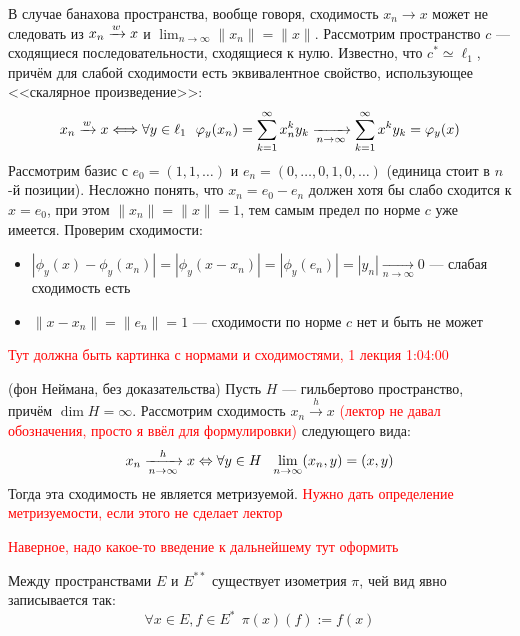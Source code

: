 \begin{anote}
	В случае банахова пространства, вообще говоря, сходимость $x_n \to x$ может не следовать из $x_n \xrightarrow{w} x$ и $\lim_{n \to \infty} \|x_n\| = \|x\|$. Рассмотрим пространство $c$ --- сходящиеся последовательности, сходящиеся к нулю. Известно, что $c^* \simeq \ell_1$, причём для слабой сходимости есть эквивалентное свойство, использующее <<скалярное произведение>>:
	\[
		x_n \xrightarrow{w} x \Longleftrightarrow \forall y \in \ell_1\ \ \varphi_y(x_n) = \sum_{k = 1}^\infty x_n^ky_k \xrightarrow[n \to \infty]{} \sum_{k = 1}^\infty x^ky_k = \varphi_y(x)
	\]
	Рассмотрим базис с $e_0 = (1, 1, \ldots)$ и $e_n = (0, \ldots, 0, 1, 0, \ldots)$ (единица стоит в $n$-й позиции). Несложно понять, что $x_n = e_0 - e_n$ должен хотя бы слабо сходится к $x = e_0$, при этом $\|x_n\| = \|x\| = 1$, тем самым предел по норме $c$ уже имеется. Проверим сходимости:
	\begin{itemize}
		\item $|\phi_y(x) - \phi_y(x_n)| = |\phi_y(x - x_n)| = |\phi_y(e_n)| = |y_n| \xrightarrow[n \to \infty]{} 0$ --- слабая сходимость есть
		
		\item $\|x - x_n\| = \|e_n\| = 1$ --- сходимости по норме $c$ нет и быть не может
	\end{itemize}
\end{anote}

\textcolor{red}{Тут должна быть картинка с нормами и сходимостями, 1 лекция 1:04:00}

\begin{theorem} (фон Неймана, без доказательства)
	Пусть $H$ --- гильбертово пространство, причём $\dim H = \infty$. Рассмотрим сходимость $x_n \xrightarrow{h} x$ \textcolor{red}{(лектор не давал обозначения, просто я ввёл для формулировки)} следующего вида:
	\[
		x_n \xrightarrow[n \to \infty]{h} x \Leftrightarrow \forall y \in H\ \ \lim_{n \to \infty} (x_n, y) = (x, y)
	\]
	Тогда эта сходимость не является метризуемой. \textcolor{red}{Нужно дать определение метризуемости, если этого не сделает лектор}
\end{theorem}

\textcolor{red}{Наверное, надо какое-то введение к дальнейшему тут оформить}

\begin{theorem}
	Между пространствами $E$ и $E^{**}$ существует изометрия $\pi$, чей вид явно записывается так:
	\[
		\forall x \in E, f \in E^*\ \ \pi(x)(f) := f(x)
	\]
\end{theorem}

